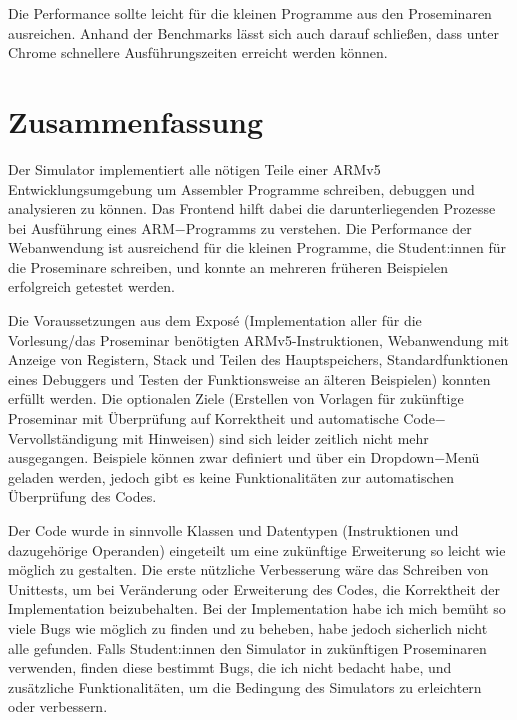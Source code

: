 \documentclass[a4paper, 11pt, onecolumn]{article}
\begin{document}
Die Performance sollte leicht für die kleinen Programme aus den Proseminaren ausreichen. Anhand der Benchmarks lässt sich auch darauf schließen, dass unter Chrome schnellere Ausführungszeiten erreicht werden können.

\newpage
\section{Zusammenfassung}\label{sec:summary}

Der Simulator implementiert alle nötigen Teile einer ARMv5 Entwicklungsumgebung um Assembler Programme schreiben, debuggen und analysieren zu können. Das Frontend hilft dabei die darunterliegenden Prozesse bei Ausführung eines ARM$-$Programms zu verstehen. Die Performance der Webanwendung ist ausreichend für die kleinen Programme, die Student:innen für die Proseminare schreiben, und konnte an mehreren früheren Beispielen erfolgreich getestet werden.

Die Voraussetzungen aus dem Exposé (Implementation aller für die Vorlesung/das Proseminar benötigten ARMv5-Instruktionen, Webanwendung mit Anzeige von Registern, Stack und Teilen des Hauptspeichers, Standardfunktionen eines Debuggers und Testen der Funktionsweise an älteren Beispielen) konnten erfüllt werden. Die optionalen Ziele (Erstellen von Vorlagen für zukünftige Proseminar mit Überprüfung auf Korrektheit und automatische Code$-$Vervollständigung mit Hinweisen) sind sich leider zeitlich nicht mehr ausgegangen. Beispiele können zwar definiert und über ein Dropdown$-$Menü geladen werden, jedoch gibt es keine Funktionalitäten zur automatischen Überprüfung des Codes.

Der Code wurde in sinnvolle Klassen und Datentypen (Instruktionen und dazugehörige Operanden) eingeteilt um eine zukünftige Erweiterung so leicht wie möglich zu gestalten. Die erste nützliche Verbesserung wäre das Schreiben von Unittests, um bei Veränderung oder Erweiterung des Codes, die Korrektheit der Implementation beizubehalten. Bei der Implementation habe ich mich bemüht so viele Bugs wie möglich zu finden und zu beheben, habe jedoch sicherlich nicht alle gefunden. Falls Student:innen den Simulator in zukünftigen Proseminaren verwenden, finden diese bestimmt Bugs, die ich nicht bedacht habe, und zusätzliche Funktionalitäten, um die Bedingung des Simulators zu erleichtern oder verbessern.

\newpage



\newpage
\appendix
\end{document}
